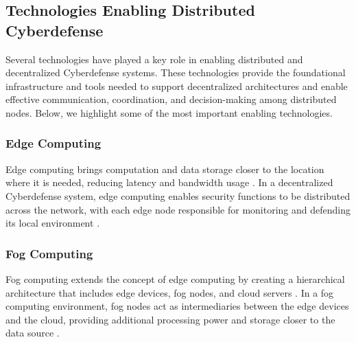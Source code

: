 


\subsection{Technologies Enabling Distributed Cyberdefense}

Several technologies have played a key role in enabling distributed and decentralized Cyberdefense systems. These technologies provide the foundational infrastructure and tools needed to support decentralized architectures and enable effective communication, coordination, and decision-making among distributed nodes. Below, we highlight some of the most important enabling technologies.

\subsubsection{Edge Computing}

Edge computing brings computation and data storage closer to the location where it is needed, reducing latency and bandwidth usage \cite{Shi2016}. In a decentralized Cyberdefense system, edge computing enables security functions to be distributed across the network, with each edge node responsible for monitoring and defending its local environment \cite{Roman2018}.

\subsubsection{Fog Computing}

Fog computing extends the concept of edge computing by creating a hierarchical architecture that includes edge devices, fog nodes, and cloud servers \cite{Bonomi2012}. In a fog computing environment, fog nodes act as intermediaries between the edge devices and the cloud, providing additional processing power and storage closer to the data source \cite{Mukherjee2017}.

